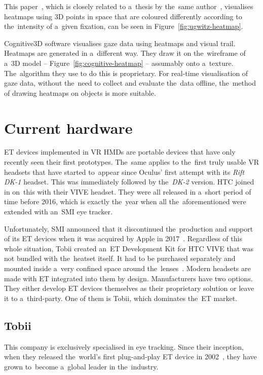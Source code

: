 \pagebreak{}
This paper~\cite{ugwitz2022}, which is closely related to a~thesis by the~same author~\cite{ugwitz2020thesis}, visualises heatmaps using 3D points in space that are coloured differently according to the~intensity of a~given fixation, can be seen in Figure~\ref{fig:ugwitz-heatmap}.

Cognitive3D software visualises gaze data using heatmaps and visual trail. Heatmaps are generated in a~different way. They draw it on the~wireframe of a~3D model -- Figure~\ref{fig:cognitive-heatmap} -- assumably onto a~texture. The~algorithm they use to do this is proprietary. For real-time visualisation of gaze data, without the~need to collect and evaluate the~data offline, the~method of drawing heatmaps on objects is more suitable. 


\section{Current hardware}
\label{sec:hardware}

ET devices implemented in VR HMDs are portable devices that have only recently seen their first prototypes. The~same applies to the~first truly usable VR headsets that have started to~appear since Oculus' first attempt with its \emph{Rift DK-1} headset. This was immediately followed by the~\emph{DK-2} version. HTC joined in on~this with their VIVE headset. They were all released in a~short period of time before 2016, which is exactly the~year when all the~aforementioned were extended with an~SMI eye tracker.~\cite{ugwitz2022}

Unfortunately, SMI announced that it discontinued the~production and support of its ET devices when it was acquired by Apple in 2017~\cite{iMotions-endSMI}. Regardless of this whole situation, Tobii created an~ET Development Kit for HTC VIVE that was not bundled with the~heatset itself. It had to be purchased separately and mounted inside a~very confined space around the~lenses~\cite{tobii-oldHTC}. Modern headsets are made with ET integrated into them by design. Manufacturers have two options. They either develop ET devices themselves as their proprietary solution or leave it to a~third-party. One of them is Tobii, which dominates the~ET market.~\cite{ugwitz2020thesis}

\subsection{Tobii}
This company is exclusively specialised in eye tracking. Since their inception, when they released the~world's first plug-and-play ET device in 2002~\cite{tobii-history}, they have grown to~become a~global leader in the~industry.

